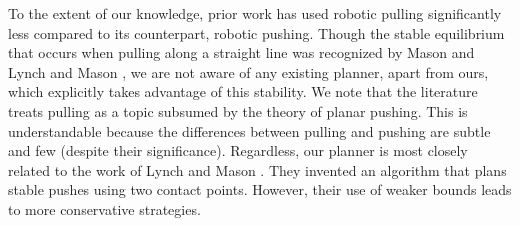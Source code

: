 \documentclass[conference]{IEEEtran}
\begin{document}
To the extent of our knowledge, prior work has used robotic pulling
significantly less compared to its counterpart, robotic pushing.
Though the stable equilibrium that occurs when pulling along a
straight line was recognized by Mason \cite{mason1986} and Lynch and
Mason \cite{lynch1995pulling}, we are not aware of any existing
planner, apart from ours, which explicitly takes advantage of this
stability. We note that the literature treats pulling as a topic
subsumed by the theory of planar pushing. This is understandable
because the differences between pulling and pushing are subtle and few
(despite their significance). Regardless, our planner is most closely
related to the work of Lynch and Mason \cite{lynch1996stable}. They
invented an algorithm that plans stable pushes using two contact
points. However, their use of weaker bounds \cite{peshkin1988motion,
  alexander1993bounds, Mason} leads to more conservative strategies.







\end{document}
